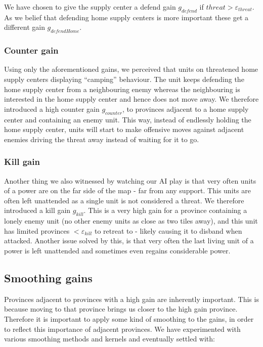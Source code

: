 \documentclass[a4paper]{article} %
\begin{document}
We have chosen to give the supply center a defend gain $g_{defend}$ if $threat > \varepsilon_{threat}$. As we belief that defending home supply centers is more important these get a different gain $g_{defendHome}$. 

\subsubsection{Counter gain}
Using only the aforementioned gains, we perceived that units on threatened home supply centers displaying  ``camping'' behaviour. The unit keeps defending the home supply center from a neighbouring enemy whereas the neighbouring is interested in the home supply center and hence does not move away. We therefore introduced a high counter gain $g_{counter}$, to provinces adjacent to a home supply center and containing an enemy unit. This way, instead of endlessly holding the home supply center, units will start to make offensive moves against adjacent enemies driving the threat away instead of waiting for it to go.        

\subsubsection{Kill gain}
Another thing we also witnessed by watching our AI play is that very often units of a power are on the far side of the map - far from any support. This units are often left unattended as a single unit is not considered a threat. We therefore introduced a kill gain $g_{kill}$. This is a very high gain for a province containing a lonely enemy unit (no other enemy units as close as two tiles away), and this unit has limited provinces $< \varepsilon_{kill}$ to retreat to - likely causing it to disband when attacked. 
Another issue solved by this, is that very often the last living unit of a power is left unattended and sometimes even regains considerable power. 

\subsection{Smoothing gains}
Provinces adjacent to provinces with a high gain are inherently important. This is because moving to that province brings us closer to the high gain province. Therefore it is important to apply some kind of smoothing to the gains, in order to reflect this importance of adjacent provinces. We have experimented with various smoothing methods and kernels and eventually settled with: 
\end{document}
